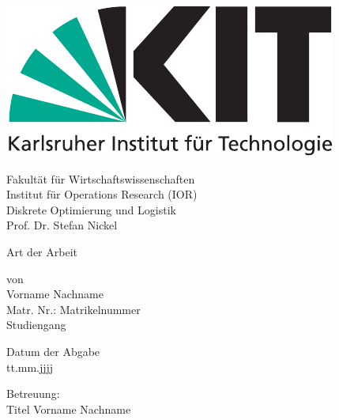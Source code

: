 \documentclass[12pt,a4paper,twoside]{article}
\theoremstyle{definition}
\numberwithin{equation}{section}
\begin{document}
\begin{titlepage}
  
\begin{center}
	\includegraphics[scale=0.8]{KITlogo_4c_deutsch_RGB.pdf} 

\vspace{1cm}

	\Large{
	Fakultät für Wirtschaftswissenschaften \\
	Institut für Operations Research (IOR) \\
	Diskrete Optimierung und Logistik \\
	Prof. Dr. Stefan Nickel}  
     
\vspace{1cm}

	\Large Art der Arbeit %
 
\vspace{1cm}
    
\setlength{\fboxrule}{3pt}

\begin{center}
\end{center}

\vspace{1cm}

	von \\
	Vorname Nachname \\
	Matr. Nr.: Matrikelnummer\\
	Studiengang \\

\vspace{1cm}

	Datum der Abgabe\\
	tt.mm.jjjj

\vspace{1cm}
	
	Betreuung: \\
	Titel Vorname Nachname 
    
\end{center}
  
\end{titlepage}
\end{document}
